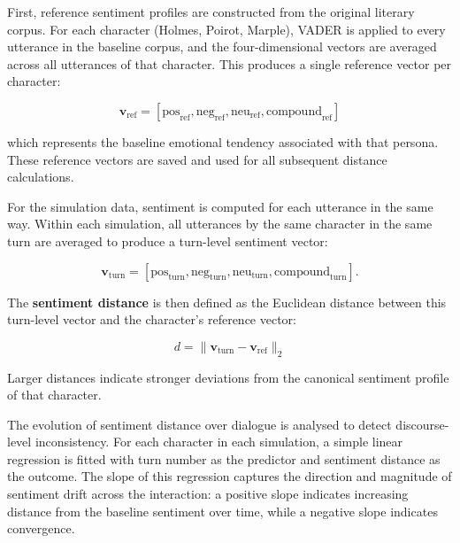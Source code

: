 \documentclass{article}
\begin{document}
First, reference sentiment profiles are constructed from the original literary corpus. For each character (Holmes, Poirot, Marple), VADER is applied to every utterance in the baseline corpus, and the four-dimensional vectors are averaged across all utterances of that character. This produces a single reference vector per character:

\begin{equation}
    \mathbf{v}_{\mathrm{ref}} = [\text{pos}_{\mathrm{ref}}, \text{neg}_{\mathrm{ref}}, \text{neu}_{\mathrm{ref}}, \text{compound}_{\mathrm{ref}}]
    \label{eq:reference sentiment vector}
\end{equation}

which represents the baseline emotional tendency associated with that persona. These reference vectors are saved and used for all subsequent distance calculations.

For the simulation data, sentiment is computed for each utterance in the same way. Within each simulation, all utterances by the same character in the same turn are averaged to produce a turn-level sentiment vector:

\begin{equation}
    \mathbf{v}_{\mathrm{turn}} = [\text{pos}_{\mathrm{turn}}, \text{neg}_{\mathrm{turn}}, \text{neu}_{\mathrm{turn}}, \text{compound}_{\mathrm{turn}}].
    \label{eq:turn-level sentiment vector}
\end{equation}

The \textbf{sentiment distance} is then defined as the Euclidean distance between this turn-level vector and the character's reference vector:

\begin{equation}
\label{eq:Euclidean sentiment distance}
    d = \|\mathbf{v}_{\mathrm{turn}} - \mathbf{v}_{\mathrm{ref}}\|_2
\end{equation}

Larger distances indicate stronger deviations from the canonical sentiment profile of that character.

The evolution of sentiment distance over dialogue is analysed to detect discourse-level inconsistency. For each character in each simulation, a simple linear regression is fitted with turn number as the predictor and sentiment distance as the outcome. The slope of this regression captures the direction and magnitude of sentiment drift across the interaction: a positive slope indicates increasing distance from the baseline sentiment over time, while a negative slope indicates convergence.
\end{document}
